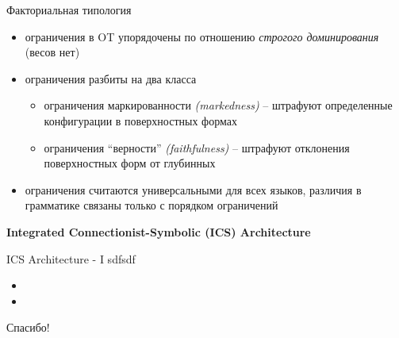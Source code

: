 \documentclass{beamer}
\begin{document}
\begin{frame}{Факториальная типология}
\begin{itemize}
	\item ограничения в OT упорядочены по отношению \textit{строгого доминирования} (весов нет)
	\medskip
	\item ограничения разбиты на два класса
		\medskip
		\begin{itemize}
			\item ограничения маркированности \textit{(markedness)} -- штрафуют определенные конфигурации в поверхностных формах
			\medskip
			\item ограничения ``верности'' \textit{(faithfulness)} -- штрафуют отклонения поверхностных форм от глубинных
		\end{itemize}
	\medskip
	\item ограничения считаются универсальными для всех языков, различия в грамматике связаны только с порядком ограничений
\end{itemize}
\end{frame}

\begin{frame}{}
\begin{center}
	\textbf{Integrated Connectionist-Symbolic (ICS) Architecture}
\end{center}
\end{frame}

\begin{frame}{ICS Architecture - I}
sdfsdf
\bigskip
\begin{itemize}
	\item 
	\medskip
	\item 
\end{itemize}
\end{frame}


\begin{frame}{}
    \thispagestyle{empty}
    \begin{center}
        {\large Спасибо!}
    \end{center}
\end{frame}
\end{document}
